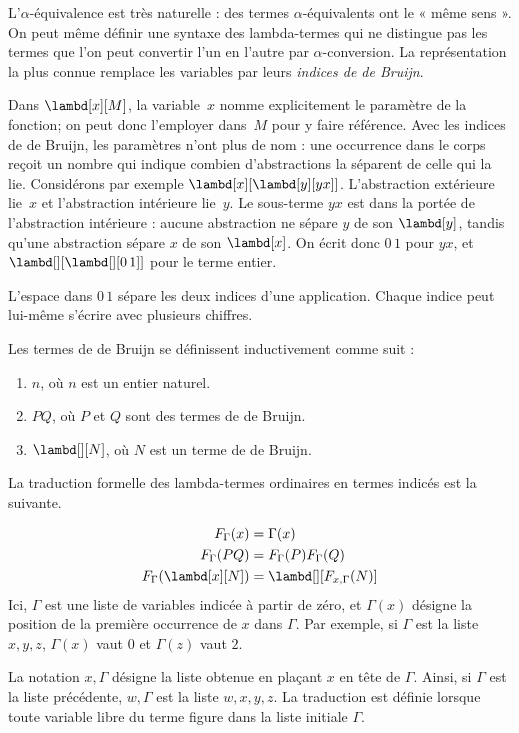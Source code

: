 \documentclass[../../../include/open-logic-section]{subfiles}
\begin{document}


L'$\alpha$-équivalence est très naturelle :
des termes $\alpha$-équivalents ont le
« même sens ». On peut même définir une
syntaxe des lambda-termes qui ne distingue
pas les termes que l'on peut convertir
l'un en l'autre par $\alpha$-conversion.
La représentation la plus connue remplace
les variables par leurs \emph{indices de
de Bruijn}.

Dans $\lambd[x][M]$, la variable~$x$
nomme explicitement le paramètre de la
fonction; on peut donc l'employer dans~$M$
pour y faire référence. Avec les indices de
de Bruijn, les paramètres n'ont plus de
nom : une occurrence dans le corps reçoit
un nombre qui indique combien d'abstractions
la séparent de celle qui la lie. Considérons
par exemple $\lambd[x][\lambd[y][y x]]$.
L'abstraction extérieure lie~$x$ et
l'abstraction intérieure lie~$y$. Le
sous-terme $y x$ est dans la portée de
l'abstraction intérieure : aucune abstraction
ne sépare $y$ de son $\lambd[y]$, tandis
qu'une abstraction sépare $x$ de son
$\lambd[x]$. On écrit donc $0\, 1$
pour $y x$, et $\lambd[][\lambd[][0\, 1]]$
pour le terme entier.

\begin{explain}
L'espace dans $0\,1$ sépare les deux indices d'une application.
Chaque indice peut lui-même s'écrire avec plusieurs chiffres.
\end{explain}

\begin{defn}
Les termes de de Bruijn se définissent
inductivement comme suit :
\begin{enumerate}
\item $n$, où $n$ est un entier naturel.
\item $PQ$, où $P$ et $Q$ sont des termes
  de de Bruijn.
\item $\lambd[][N]$, où $N$ est un terme
  de de Bruijn.
\end{enumerate}
\end{defn}

La traduction formelle des lambda-termes
ordinaires en termes indicés est la suivante.
\begin{defn}
\begin{align*}
  F_\Gamma(x) &= \Gamma(x) \\
  F_\Gamma(PQ) &= F_\Gamma(P)F_\Gamma(Q) \\
  F_\Gamma(\lambd[x][N])
    &= \lambd[][F_{x,\Gamma}(N)]
\end{align*}
Ici, $\Gamma$ est une liste de variables
indicée à partir de zéro, et $\Gamma(x)$
désigne la position de la première occurrence
de $x$ dans $\Gamma$. Par exemple, si
$\Gamma$ est la liste $x,y,z$,
$\Gamma(x)$ vaut $0$ et $\Gamma(z)$ vaut $2$.

La notation $x,\Gamma$ désigne la liste
obtenue en plaçant $x$ en tête de $\Gamma$.
Ainsi, si $\Gamma$ est la liste précédente,
$w,\Gamma$ est la liste $w,x,y,z$.
La traduction est définie lorsque toute
variable libre du terme figure dans la liste
initiale $\Gamma$.
\end{defn}
\end{document}

